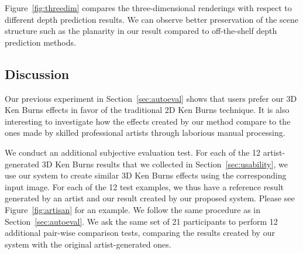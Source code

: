 \documentclass[acmtog,authorversion]{acmart}
\begin{document}
Figure~\ref{fig:threedim} compares the three-dimensional renderings with respect to different depth prediction results. We can observe better preservation of the scene structure such as the planarity in our result compared to off-the-shelf depth prediction methods.

\subsection{Discussion}

Our previous experiment in Section~\ref{sec:autoeval} shows that users prefer our 3D Ken Burns effects in favor of the traditional 2D Ken Burns technique. It is also interesting to investigate how the effects created by our method compare to the ones made by skilled professional artists through laborious manual processing. 

We conduct an additional subjective evaluation test. For each of the 12 artist-generated 3D Ken Burns results that we collected in Section~\ref{sec:usability}, we use our system to create similar 3D Ken Burns effects using the corresponding input image. For each of the 12 test examples, we thus have a reference result generated by an artist and our result created by our proposed system. Please see Figure~\ref{fig:artisan} for an example. We follow the same procedure as in Section~\ref{sec:autoeval}. We ask the same set of 21 participants to perform 12 additional pair-wise comparison tests, comparing the results created by our system with the original artist-generated ones. 
\end{document}
